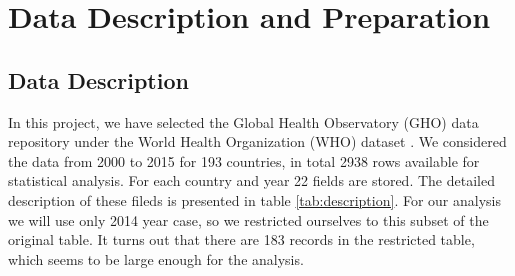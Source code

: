 \section{Data Description and Preparation}
\label{sec:data-preparation}

\subsection{Data Description}
\label{sec:data-description}

In this project, we have selected the Global Health Observatory (GHO) data repository under the World Health Organization (WHO) dataset \cite{WHO}.  We considered the data from 2000 to 2015 for 193 countries, in total 2938 rows available for statistical analysis. For each country and year 22 fields are stored. The detailed description of these fileds is presented in table \ref{tab:description}. For our analysis we will use only 2014 year case, so we restricted ourselves to this subset of the original table. It turns out that there are 183 records in the restricted table, which seems to be large enough for the analysis.

